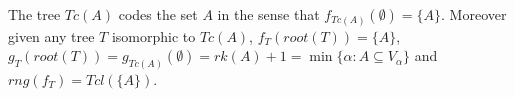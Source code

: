 \begin{theorem} The tree $Tc(A)$ codes the set $A$ in the sense that
$f_{Tc(A)}(\emptyset) = \{A\}$. Moreover given any tree $T$ isomorphic to $Tc(A)$,
$f_T(root(T))=\{A\}$, $g_T(root(T)) = g_{Tc(A)}(\emptyset)=rk(A)+1=\min\{\alpha:A\subseteq V_\alpha\}$
and $rng(f_T)=Tcl(\{A\})$.
\end{theorem}


%
%
%


